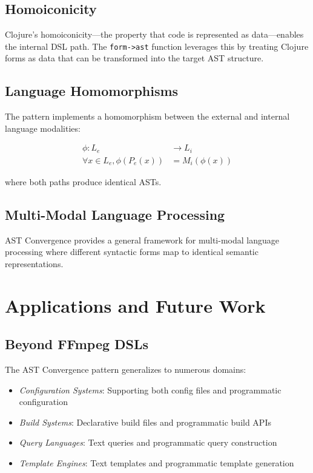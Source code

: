 \documentclass[conference]{IEEEtran}
\begin{document}
\subsection{Homoiconicity}

Clojure's homoiconicity---the property that code is represented as data---enables the internal DSL path. The \texttt{form->ast} function leverages this by treating Clojure forms as data that can be transformed into the target AST structure.

\subsection{Language Homomorphisms}

The pattern implements a homomorphism between the external and internal language modalities:

\begin{align*}
\phi: L_e &\rightarrow L_i\\
\forall x \in L_e, \phi(P_e(x)) &= M_i(\phi(x))
\end{align*}

where both paths produce identical ASTs.

\subsection{Multi-Modal Language Processing}

AST Convergence provides a general framework for multi-modal language processing where different syntactic forms map to identical semantic representations.

\section{Applications and Future Work}

\subsection{Beyond FFmpeg DSLs}

The AST Convergence pattern generalizes to numerous domains:

\begin{itemize}
\item \emph{Configuration Systems}: Supporting both config files and programmatic configuration
\item \emph{Build Systems}: Declarative build files and programmatic build APIs
\item \emph{Query Languages}: Text queries and programmatic query construction
\item \emph{Template Engines}: Text templates and programmatic template generation
\end{itemize}
\end{document}
